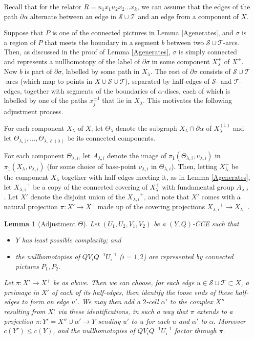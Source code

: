 \documentclass[12pt,a4paper]{amsart}
\def\a{\alpha}
\def\cS{\mathcal{S}}
\def\cT{\mathcal{T}}
\newtheorem{lem}[thm]{Lemma}
\begin{document}
\smallskip 
Recall that for the relator $R=u_1x_1u_2x_2\dots x_k$, 
	we can assume that the edges of the path $\partial\alpha$ alternate between an edge
	in $\cS\cup\cT$ and an edge  
from a component of $X$. 

Suppose that $P$ is one of the connected pictures in Lemma \ref{Agenerates}, and $\sigma$ is a region of $P$ that meets the boundary in a segment $b$ between two $\cS\cup\cT$-arcs.  Then, as discussed in the proof of Lemma \ref{Agenerates}, $\sigma$ is simply connected and represents a nullhomotopy of the label of $\partial\sigma$ in some component $X_\lambda^+$ of $X^+$.  
Now $b$ is part of $\partial\sigma$, labelled by some path in  $X_\lambda$.  
The rest of $\partial\sigma$ consists of $\cS\cup\cT$-arcs 
(which map to points in $X\cup\cS\cup\cT$), separated by half-edges of $\cS$- and $\cT$-edges, together with segments of the boundaries of $\a$-discs, each of which is labelled by one of the paths $x_j^{\pm1}$ that lie in $X_\lambda$.     
This motivates the following adjustment process.


 

For each component $X_\lambda$ of $X$, let $\Theta_\lambda$ denote the subgraph $X_\lambda\cap\partial\a$ of $X_\lambda^{(1)}$ and let $\Theta_{\lambda,1},\dots,\Theta_{\lambda,\ell(\lambda)}$ be its connected components.

	
	For each component $\Theta_{\lambda,i}$,  let $A_{\lambda,i}$ denote the image of $\pi_1(\Theta_{\lambda,i},v_{\lambda,i})$ in 
 $\pi_1(X_\lambda,v_{\lambda,i})$ (for some choice of base-point $v_{\lambda,i}$ in $\Theta_{\lambda,i}$). 
	 Then, letting $X_\lambda^+$  be the component $X_\lambda$ together with half edges meeting it, 
	 as in Lemma \ref{Agenerates},  let   ${X_{\lambda,i}}^+$ be a copy of the connected covering of   $X_\lambda^+$ with fundamental group $A_{\lambda,i}$. 	 
	 Let $X'$ denote the disjoint union of the ${X_{\lambda,i}}^+$, and note that $X'$ comes with a natural projection $\pi:X'\to X^+$ made up of the covering projections ${X_{\lambda,i}}^+\to {X_\lambda}^+$.
	
\begin{lem}[Adjustment $\Theta$]\label{Theta} 
Let $(U_1,U_2,V_1,V_2)$ be a $(Y,Q)$-CCE such that
\begin{itemize}
\item $Y$ has least possible complexity; and
\item the nullhomotopies of $QV_iQ^{-1}U_i^{-1}$ ($i=1,2$) are represented by connected pictures $P_1,P_2$.
\end{itemize}
Let $\pi:X'\to X^+$ be as above. 
Then we can choose, for each edge $u\in\cS\cup\cT\subset X$, a preimage in $X'$ of each of its half-edges, then identify the loose ends of these half-edges to form an edge $u'$.  We may then
 add a $2$-cell $\a'$ to  the complex $X''$ resulting from $X'$ via these identifications, in such a way that $\pi$ extends to a projection $\pi:Y'=X''\cup\a'\to Y$ sending $u'$ to $u$ for each $u$ and $\a'$ to $\a$.  Moreover $c(Y')\le c(Y)$, and the nullhomotopies of $QV_iQ^{-1}U_i^{-1}$ factor through $\pi$.
\end{lem}
\end{document}
